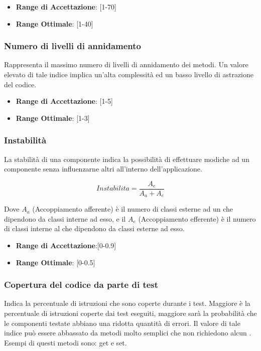 \documentclass[12pt,a4paper]{article}
\begin{document}
	\begin{itemize}
		\item \textbf{Range di Accettazione}: [1-70]
		\item \textbf{Range Ottimale}: [1-40]
	\end{itemize}
	
	\subsubsection{Numero di livelli di annidamento}
	Rappresenta il massimo numero di livelli di annidamento dei metodi. Un valore elevato di tale indice implica un'alta complessità ed un basso livello di astrazione del codice.
	
	\begin{itemize}
		\item \textbf{Range di Accettazione}: [1-5]
		\item \textbf{Range Ottimale}: [1-3]
	\end{itemize}
	
	\subsubsection{Instabilità}
	La stabilità di una componente indica la possibilità di effettuare modiche ad un componente senza influenzarne altri all'interno dell'applicazione.
	
	\[Instabilita=\frac{A_e}{A_a+A_e}\]
	
	Dove $A_a$ (Accoppiamento afferente) è il numero di classi esterne ad un  che dipendono da classi interne ad esso, e il $A_e$ (Accoppiamento efferente) è il numero di classi interne al  che dipendono da classi esterne ad esso.
	
	\begin{itemize}
		\item \textbf{Range di Accettazione}:[0-0.9]
		\item \textbf{Range Ottimale}: [0-0.5]
	\end{itemize}
	
	\subsubsection{Copertura del codice da parte di test}
	Indica la percentuale di istruzioni che sono coperte durante i test. Maggiore è la percentuale di istruzioni coperte dai test eseguiti, maggiore sarà la probabilità che le componenti testate abbiano una ridotta quantità di errori. Il valore di tale indice può essere abbassato da metodi molto semplici che non richiedono alcun . Esempi di questi metodi sono: get e set.
	
\end{document}
